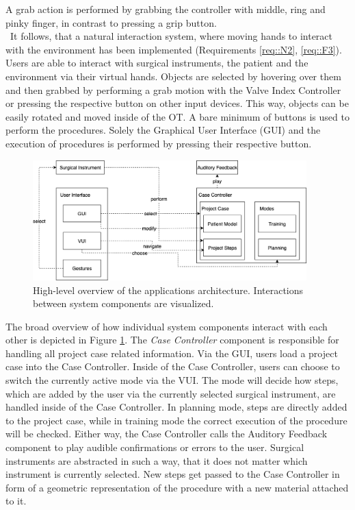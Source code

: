 A grab action is performed by grabbing the controller with middle, ring and pinky finger, in contrast to pressing a grip button.
\\ It follows, that a natural interaction system, where moving hands to interact with the environment has been implemented (Requirements \ref{req::N2}, \ref{req::F3}).
Users are able to interact with surgical instruments, the patient and the environment via their virtual hands.
Objects are selected by hovering over them and then grabbed by performing a grab motion with the Valve Index Controller or pressing the respective button on other input devices.
This way, objects can be easily rotated and moved inside of the OT.
A bare minimum of buttons is used to perform the procedures.
Solely the Graphical User Interface (GUI) and the execution of procedures is performed by pressing their respective button.

\begin{figure}[ht]
    \centering
    \includegraphics[width=400px]{images/implementation/architecture.png}
    \caption{\label{fig::ImplementationArchitecture}High-level overview of the applications architecture. Interactions between system components are visualized.}
\end{figure}

The broad overview of how individual system components interact with each other is depicted in Figure \ref{fig::ImplementationArchitecture}.
The \emph{Case Controller} component is responsible for handling all project case related information.
Via the GUI, users load a project case into the Case Controller.
Inside of the Case Controller, users can choose to switch the currently active mode via the VUI.
The mode will decide how steps, which are added by the user via the currently selected surgical instrument, are handled inside of the Case Controller.
In planning mode, steps are directly added to the project case, while in training mode the correct execution of the procedure will be checked.
Either way, the Case Controller calls the Auditory Feedback component to play audible confirmations or errors to the user.
Surgical instruments are abstracted in such a way, that it does not matter which instrument is currently selected.
New steps get passed to the Case Controller in form of a geometric representation of the procedure with a new material attached to it.
